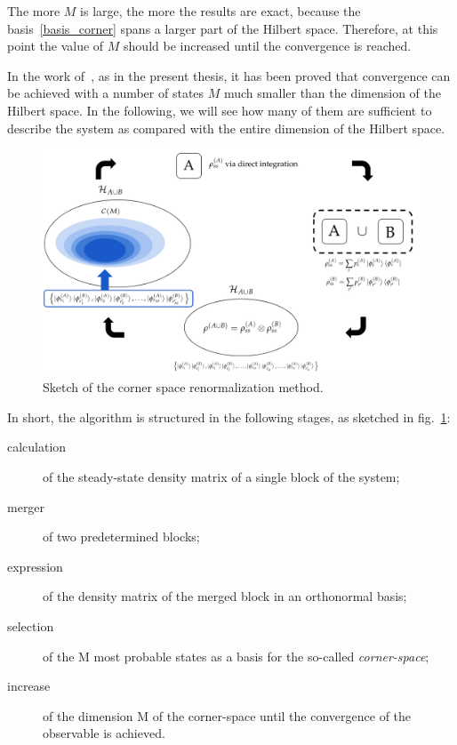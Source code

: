 The more $M$ is large, the more the results are exact, because the basis~\ref{basis_corner} spans a larger part of the Hilbert space. Therefore, at this point the value of $M$ should be increased until the convergence is reached.

In the work of~\cite{PhysRevLett.115.080604}, as in the present thesis, it has been proved that convergence can be achieved with a number of states $M$ much smaller than the dimension of the Hilbert space. In the following, we will see how many of them are sufficient to describe the system as compared with the entire dimension of the Hilbert space.


\begin{figure}
    \centering
    \includegraphics[scale=0.55]{Figures/csr_sketch}
    \caption{Sketch of the corner space renormalization method.}
    \label{fig:csr_sketch}
\end{figure}

\bigskip
In short, the algorithm is structured in the following stages, as sketched in fig.~\ref{fig:csr_sketch}:
\begin{description}
    \item[calculation] of the steady-state density matrix of a single block of the system;
    \item[merger] of two predetermined blocks;
    \item[expression] of the density matrix of the merged block in an orthonormal basis;
    \item[selection] of the M most probable states as a basis for the so-called \emph{corner-space};
    \item[increase] of the dimension M of the corner-space until the convergence of the observable is achieved.
\end{description}

